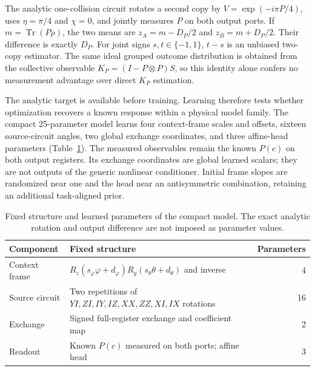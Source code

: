 \documentclass[pdflatex,sn-mathphys-num]{sn-jnl}
\newcommand{\Tr}{\operatorname{Tr}}
\begin{document}
The analytic one-collision circuit rotates a second copy by $V=\exp(-i\pi P/4)$, uses $\eta=\pi/4$ and $\chi=0$, and jointly measures $P$ on both output ports. If $m=\Tr(P\rho)$, the two means are $z_A=m-D_P/2$ and $z_B=m+D_P/2$. Their difference is exactly $D_P$. For joint signs $s,t\in\{-1,1\}$, $t-s$ is an unbiased two-copy estimator. The same ideal grouped outcome distribution is obtained from the collective observable $K_P=(I-P\otimes P)S$, so this identity alone confers no measurement advantage over direct $K_P$ estimation.

The analytic target is available before training. Learning therefore tests whether optimization recovers a known response within a physical model family. The compact 25-parameter model learns four context-frame scales and offsets, sixteen source-circuit angles, two global exchange coordinates, and three affine-head parameters (Table~\ref{tab:learned}). The measured observables remain the known $P(c)$ on both output registers. Its exchange coordinates are global learned scalars; they are not outputs of the generic nonlinear conditioner. Initial frame slopes are randomized near one and the head near an antisymmetric combination, retaining an additional task-aligned prior.

\begin{table}[t]
\caption{Fixed structure and learned parameters of the compact model. The exact analytic rotation and output difference are not imposed as parameter values.}\label{tab:learned}
\begin{tabularx}{\linewidth}{@{}p{.20\linewidth}X r@{}}\toprule
Component & Fixed structure & Parameters\\\midrule
Context frame & $R_z(s_\varphi\varphi+d_\varphi)R_y(s_\theta\theta+d_\theta)$ and inverse & 4\\
Source circuit & Two repetitions of $YI,ZI,IY,IZ,XX,ZZ,XI,IX$ rotations & 16\\
Exchange & Signed full-register exchange and coefficient map & 2\\
Readout & Known $P(c)$ measured on both ports; affine head & 3\\\bottomrule
\end{tabularx}
\end{table}
\end{document}
